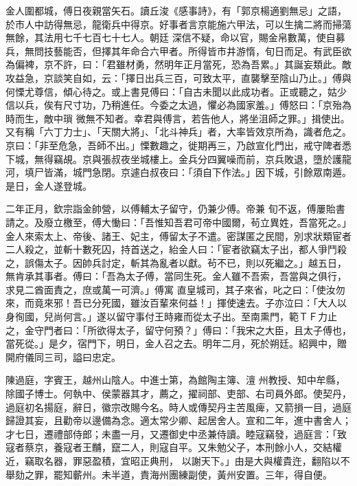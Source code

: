 \begin{pinyinscope}
 金人圍都城，傅日夜親當矢石。讀丘浚《感事詩》，有「郭京楊適劉無忌」之語，於市人中訪得無忌，龍衛兵中得京。好事者言京能施六甲法，可以生擒二將而掃蕩無餘，其法用七千七百七十七人。朝廷
 深信不疑，命以官，賜金帛數萬，使自募兵，無問技藝能否，但擇其年命合六甲者。所得皆市井游惰，旬日而足。有武臣欲為偏裨，京不許，曰：「君雖材勇，然明年正月當死，恐為吾累。」其誕妄類此。敵攻益急，京談笑自如，云：「擇日出兵三百，可致太平，直襲擊至陰山乃止。」傅與何慄尤尊信，傾心待之。或上書見傅曰：「自古未聞以此成功者。正或聽之，姑少信以兵，俟有尺寸功，乃稍進任。今委之太過，懼必為國家羞。」傅怒曰：「京殆為時而生，敵中瑣
 微無不知者。幸君與傅言，若告他人，將坐沮師之罪。」揖使出。又有稱「六丁力士」、「天關大將」、「北斗神兵」者，大率皆效京所為，識者危之。京曰：「非至危急，吾師不出。」慄數趣之，徙期再三，乃啟宣化門出，戒守陴者悉下城，無得竊覘。京與張叔夜坐城樓上。金兵分四翼噪而前，京兵敗退，墮於護龍河，填尸皆滿，城門急閉。京遽白叔夜曰：「須自下作法。」因下城，引餘眾南遁。是日，金人遂登城。



 二年正月，欽宗詣金帥營，以傅輔太子留守，仍兼少傅。帝兼
 旬不返，傅屢貽書請之。及廢立檄至，傅大慟曰：「吾惟知吾君可帝中國爾，茍立異姓，吾當死之。」金人來索太上、帝後、諸王、妃主，傅留太子不遣。密謀匿之民間，別求狀類宦者二人殺之，並斬十數死囚，持首送之，紿金人曰：「宦者欲竊太子出，都人爭鬥殺之，誤傷太子。因帥兵討定，斬其為亂者以獻。茍不已，則以死繼之。」越五日，無肯承其事者。傅曰：「吾為太子傅，當同生死。金人雖不吾索，吾當與之俱行，求見二酋面責之，庶或萬一可濟。」傅寓
 直皇城司，其子來省，叱之曰：「使汝勿來，而竟來邪！吾已分死國，雖汝百輩來何益！」揮使速去。子亦泣曰：「大人以身徇國，兒尚何言。」遂以留守事付王時雍而從太子出。至南熏門，範ＴＦ力止之，金守門者曰：「所欲得太子，留守何預？」傅曰：「我宋之大臣，且太子傅也，當死從。」是夕，宿門下，明日，金人召之去。明年二月，死於朔廷。紹興中，贈開府儀同三司，謚曰忠定。



 陳過庭，字賓王，越州山陰人。中進士第，為館陶主簿、澶
 州教授、知中牟縣，除國子博士。何執中、侯蒙器其才，薦之，擢祠部、吏部、右司員外郎。使契丹，過庭初名揚庭，辭日，徽宗改賜今名。時人或傳契丹主苦風痺，又箭損一目，過庭歸證其妄，且勸帝以邊備為念。適太常少卿、起居舍人。宣和二年，進中書舍人；才七日，遷禮部侍郎；未盡一月，又遷御史中丞兼侍讀。睦寇竊發，過庭言：「致寇者蔡京，養寇者王黼，竄二人，則寇自平。又朱勉父子，本刑餘小人，交結權近，竊取名器，罪惡盈積，宜昭正典刑，
 以謝天下。」由是大與權貴迕，翻陷以不舉劾之罪，罷知蘄州。未半道，責海州團練副使，黃州安置。三年，得自便。




\end{pinyinscope}
